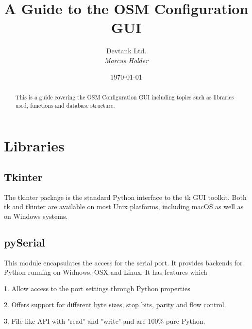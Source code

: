 \documentclass[a4paper,12pt, notitlepage]{article}
\begin{document}
\title{\textbf{\large{A Guide to the OSM Configuration GUI}}}

\author{\normalsize{Devtank Ltd.} \\
        \small\textit{
        Marcus Holder}}
\date{\today}

\maketitle 
\thispagestyle{fancy}

\begin{abstract} 
\noindent
This is a guide covering the OSM Configuration GUI including topics such as libraries used, functions and database structure. 
\end{abstract}
\vspace{11mm}

\newpage

\section{Libraries}
\label{sec: libraries}

\subsection{Tkinter}
\label{ssec: libtkinter}

The tkinter package is the standard Python interface to the tk GUI toolkit. Both tk and tkinter are available on most Unix platforms, including macOS as well as on Windows systems.

\subsection{pySerial}
\label{libpyserial}

This module encapsulates the access for the serial port. It provides backends for Python running on Widnows, OSX and Linux. It has features which 

1. Allow access to the port settings through Python properties

2. Offers support for different byte sizes, stop bits, parity and flow control.

3. File like API with "read" and "write" and are 100\% pure Python.
\end{document}
